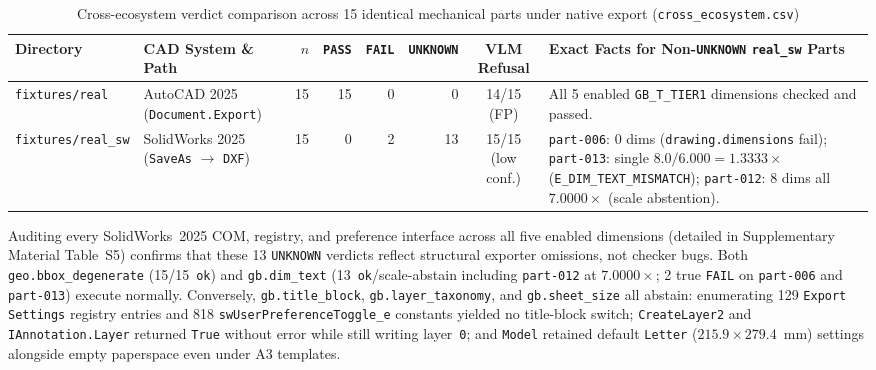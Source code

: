 \documentclass[nocopyright,nolists,upint,varvw,hyphenate]{asmejour}
\begin{document}
\begin{table}[t]
\caption{Cross-ecosystem verdict comparison across 15 identical mechanical parts under native export (\texttt{cross\_ecosystem.csv})}\label{tab:cross_ecosystem}
\centering
\footnotesize
\setlength{\tabcolsep}{3pt}
%
\begin{tabularx}{\textwidth}{L{2.2cm} L{3.3cm} r r r r c Y}
\toprule
Directory & CAD System \& Path & $n$ & \texttt{PASS} & \texttt{FAIL} & \texttt{UNKNOWN} & VLM Refusal & Exact Facts for Non-\texttt{UNKNOWN} \texttt{real\_sw} Parts \\
\midrule
\texttt{fixtures/real} & AutoCAD 2025 (\texttt{Document.Export}) & 15 & 15 & 0 & 0 & 14/15 (FP) & All 5 enabled \texttt{GB\_T\_TIER1} dimensions checked and passed. \\
\texttt{fixtures/real\_sw} & SolidWorks 2025 (\texttt{SaveAs} $\to$ \texttt{DXF}) & 15 & 0 & 2 & 13 & 15/15 (low conf.) &
\texttt{part-006}: 0 dims (\texttt{drawing.dimensions} fail); \texttt{part-013}: single $8.0/6.000 = 1.3333\times$ (\texttt{E\_DIM\_TEXT\_MISMATCH}); \texttt{part-012}: 8 dims all $7.0000\times$ (scale abstention). \\
\bottomrule
\end{tabularx}
\end{table}

Auditing every SolidWorks~2025 COM, registry, and preference interface across all five enabled dimensions (detailed in Supplementary Material Table~S5) confirms that these 13 \texttt{UNKNOWN} verdicts reflect structural exporter omissions, not checker bugs. Both \texttt{geo.bbox\_degenerate} (15/15~\texttt{ok}) and \texttt{gb.dim\_text} (13~\texttt{ok}/scale-abstain including \texttt{part-012} at $7.0000\times$; 2 true \texttt{FAIL} on \texttt{part-006} and \texttt{part-013}) execute normally. Conversely, \texttt{gb.title\_block}, \texttt{gb.layer\_taxonomy}, and \texttt{gb.sheet\_size} all abstain: enumerating 129 \texttt{Export Settings} registry entries and 818 \texttt{swUserPreferenceToggle\_e} constants yielded no title-block switch; \texttt{CreateLayer2} and \texttt{IAnnotation.Layer} returned \texttt{True} without error while still writing layer~\texttt{0}; and \texttt{Model} retained default \texttt{Letter} ($215.9 \times 279.4$~mm) settings alongside empty paperspace even under A3 templates.
\end{document}
